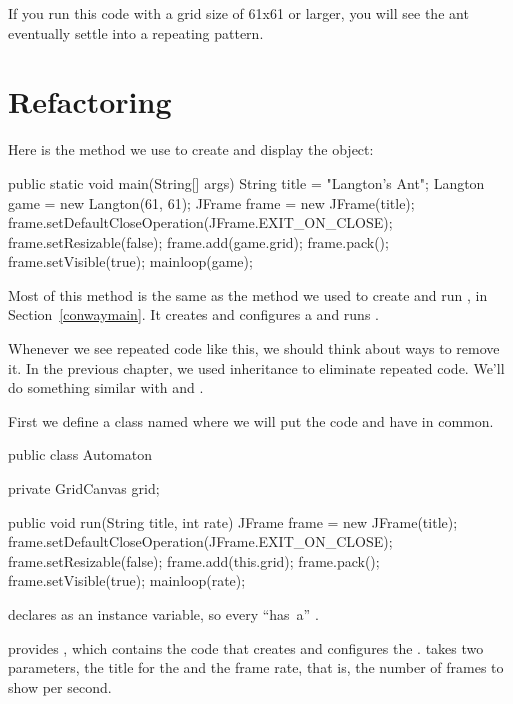 If you run this code with a grid size of 61x61 or larger, you will see the ant eventually settle into a repeating pattern.


\section{Refactoring}

Here is the  method we use to create and display the  object:

\begin{code}
public static void main(String[] args) {
    String title = "Langton's Ant";
    Langton game = new Langton(61, 61);
    JFrame frame = new JFrame(title);
    frame.setDefaultCloseOperation(JFrame.EXIT_ON_CLOSE);
    frame.setResizable(false);
    frame.add(game.grid);
    frame.pack();
    frame.setVisible(true);
    mainloop(game);
}
\end{code}

Most of this method is the same as the  method we used to create and run , in Section~\ref{conwaymain}.
It creates and configures a  and runs .

Whenever we see repeated code like this, we should think about ways to remove it.
In the previous chapter, we used inheritance to eliminate repeated code.
We'll do something similar with  and .

First we define a class named  where we will put the code  and  have in common.

\begin{code}
public class Automaton {
    private GridCanvas grid;

    public void run(String title, int rate) {
        JFrame frame = new JFrame(title);
        frame.setDefaultCloseOperation(JFrame.EXIT_ON_CLOSE);
        frame.setResizable(false);
        frame.add(this.grid);
        frame.pack();
        frame.setVisible(true);
        mainloop(rate);
    }
}
\end{code}

 declares  as an instance variable, so every  ``has~a'' .

 provides , which contains the code that creates and configures the .
 takes two parameters, the title for the  and the frame rate, that is, the number of frames to show per second.

